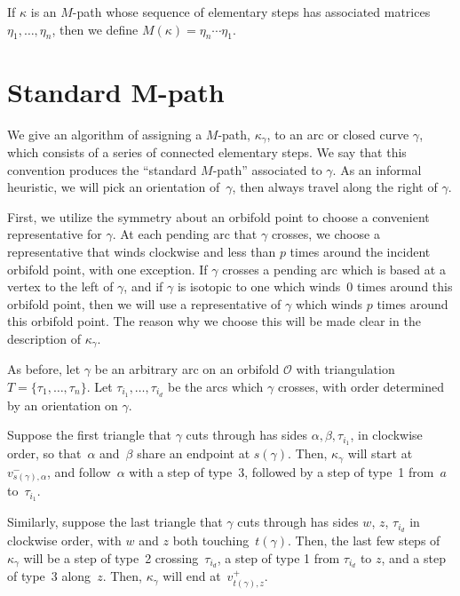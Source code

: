 \begin{Definition}If $\kappa$ is an $M$-path whose sequence of elementary steps has associated matrices $\eta_1,\ldots, \eta_n$, then we define $M(\kappa) = \eta_n \cdots \eta_1$.
\end{Definition}

\section[Standard $M$-path]{Standard $\boldsymbol{M}$-path}\label{sec:StandardMPath}

We give an algorithm of assigning a $M$-path, $\kappa_\gamma$, to an arc or closed curve $\gamma$, which consists of a series of connected elementary steps. We say that this convention produces the ``standard $M$-path'' associated to $\gamma$. As an informal heuristic, we will pick an orientation of~$\gamma$, then always travel along the right of $\gamma$.

First, we utilize the symmetry about an orbifold point to choose a convenient representative for $\gamma$. At each pending arc that $\gamma$ crosses, we choose a representative that winds clockwise and less than $p$ times around the incident orbifold point, with one exception. If $\gamma$ crosses a pending arc which is based at a vertex to the left of $\gamma$, and if $\gamma$ is isotopic to one which winds~0 times around this orbifold point, then we will use a representative of $\gamma$ which winds $p$ times around this orbifold point. The reason why we choose this will be made clear in the description of $\kappa_\gamma$.

As before, let $\gamma$ be an arbitrary arc on an orbifold $\mathcal{O}$ with triangulation $T = \{\tau_1,\ldots, \tau_n\}$. Let $\tau_{i_1},\ldots, \tau_{i_d}$ be the arcs which $\gamma$ crosses, with order determined by an orientation on $\gamma$.

Suppose the first triangle that $\gamma$ cuts through has sides $\alpha,\beta,\tau_{i_1}$, in clockwise order, so that~$\alpha$ and~$\beta$ share an endpoint at $s(\gamma)$. Then, $\kappa_\gamma$ will start at $v_{s(\gamma),\alpha}^-$, and follow~$\alpha$ with a step of type~3, followed by a step of type~1 from~$a$ to~$\tau_{i_1}$.

Similarly, suppose the last triangle that $\gamma$ cuts through has sides $w$, $z$, $\tau_{i_d}$ in clockwise order, with $w$ and $z$ both touching~$t(\gamma)$. Then, the last few steps of $\kappa_\gamma$ will be a step of type~2 crossing~$\tau_{i_d}$, a step of type 1 from $\tau_{i_d}$ to $z$, and a step of type~3 along~$z$. Then, $\kappa_\gamma$ will end at~$v^+_{t(\gamma),z}$.

